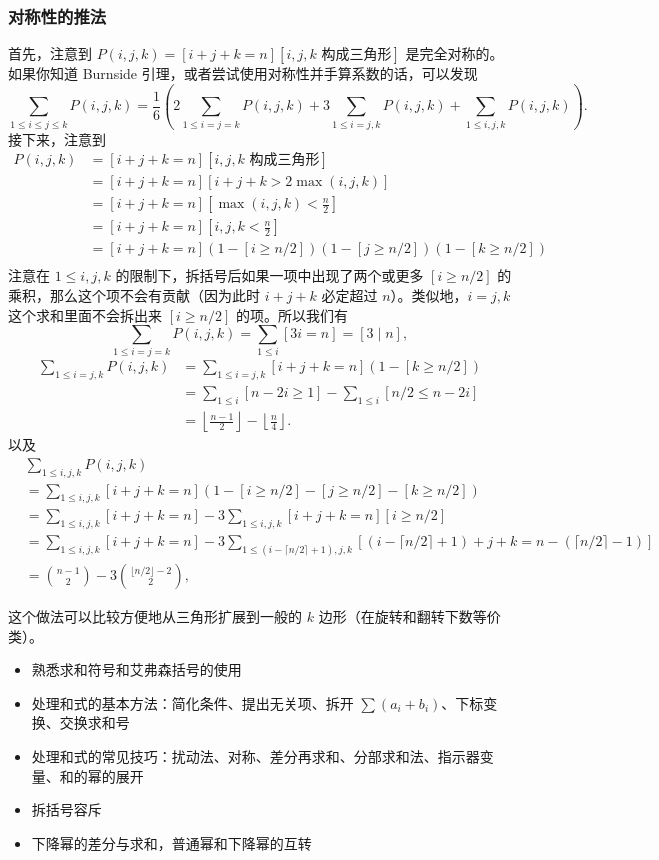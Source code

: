     \subsubsection*{对称性的推法}
    首先，注意到 $P(i,j,k)=[i+j+k=n][i,j,k\text{ 构成三角形}]$ 是完全对称的。如果你知道 Burnside 引理，或者尝试使用对称性并手算系数的话，可以发现
    $$
    \sum_{1\le i\le j\le k}P(i,j,k)=\frac{1}{6}\left(2\sum_{1\le i=j=k} P(i,j,k)+3\sum_{1\le i=j,k}P(i,j,k)+\sum_{1\le i,j,k}P(i,j,k)\right).
    $$
    接下来，注意到
    $$
    \begin{aligned}
    P(i,j,k)&=[i+j+k=n][i,j,k\text{ 构成三角形}]\\
    &=[i+j+k=n][i+j+k>2\max(i,j,k)]\\
    &=[i+j+k=n][\max(i,j,k)<\frac{n}{2}]\\
    &=[i+j+k=n][i,j,k<\frac{n}{2}]\\
    &=[i+j+k=n](1-[i\ge n/2])(1-[j\ge n/2])(1-[k\ge n/2])\\
    \end{aligned}
    $$
    注意在 $1\le i,j,k$ 的限制下，拆括号后如果一项中出现了两个或更多 $[i\ge n/2]$ 的乘积，那么这个项不会有贡献（因为此时 $i+j+k$ 必定超过 $n$）。类似地，$i=j,k$ 这个求和里面不会拆出来 $[i\ge n/2]$ 的项。所以我们有
    $$
    \sum_{1\le i=j=k}P(i,j,k)=\sum_{1\le i}[3i=n]=[3\mid n],
    $$
    $$
    \begin{aligned}
    \sum_{1\le i=j,k}P(i,j,k)&=\sum_{1\le i=j,k}[i+j+k=n](1-[k\ge n/2])\\
    &=\sum_{1\le i}[n-2i\ge 1]-\sum_{1\le i}[n/2\le n-2i]\\
    &=\left\lfloor\frac{n-1}{2}\right\rfloor-\left\lfloor\frac{n}{4}\right\rfloor.
    \end{aligned}
    $$
    以及
    $$
    \begin{aligned}
    &\sum_{1\le i,j,k}P(i,j,k)\\
    &=\sum_{1\le i,j,k}[i+j+k=n](1-[i\ge n/2]-[j\ge n/2]-[k\ge n/2])\\
    &=\sum_{1\le i,j,k}[i+j+k=n]-3\sum_{1\le i,j,k}[i+j+k=n][i\ge n/2]\\
    &=\sum_{1\le i,j,k}[i+j+k=n]-3\sum_{1\le (i-\lceil n/2\rceil+1),j,k}[(i-\lceil n/2\rceil+1)+j+k=n-(\lceil n/2\rceil-1)]\\
    &=\binom{n-1}{2}-3\binom{\lfloor n/2\rfloor-2}{2},
    \end{aligned}
    $$

    这个做法可以比较方便地从三角形扩展到一般的 $k$ 边形（在旋转和翻转下数等价类）。

\begin{summary}
    \begin{itemize}
        \item 熟悉求和符号和艾弗森括号的使用
        \item 处理和式的基本方法：简化条件、提出无关项、拆开 $\sum (a_i+b_i)$、下标变换、交换求和号
        \item 处理和式的常见技巧：扰动法、对称、差分再求和、分部求和法、指示器变量、和的幂的展开
        \item 拆括号容斥
        \item 下降幂的差分与求和，普通幂和下降幂的互转
    \end{itemize}
\end{summary}